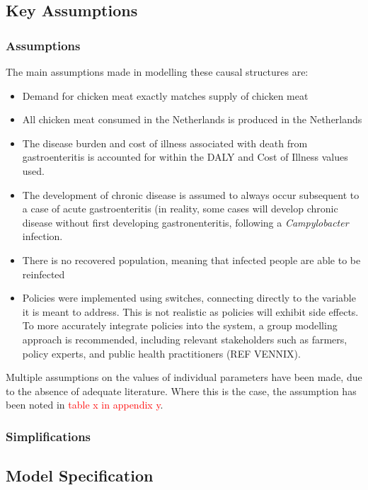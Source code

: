 \subsection{Key Assumptions}
\subsubsection{Assumptions}
The main assumptions made in modelling these causal structures are:
\begin{itemize}
    \item Demand for chicken meat exactly matches supply of chicken meat
    \item All chicken meat consumed in the Netherlands is produced in the Netherlands
    \item The disease burden and cost of illness associated with death from gastroenteritis is accounted for within the DALY and Cost of Illness values used.
    \item The development of chronic disease is assumed to always occur subsequent to a case of acute gastroenteritis (in reality, some cases will develop chronic disease without first developing gastronenteritis, following a \textit{Campylobacter} infection.
    \item There is no recovered population, meaning that infected people are able to be reinfected
    \item Policies were implemented using switches, connecting directly to the variable it is meant to address. This is not realistic as policies will exhibit side effects. To more accurately integrate policies into the system,  a group modelling approach is recommended, including relevant stakeholders such as farmers, policy experts, and public health practitioners (REF VENNIX).
\end{itemize}

Multiple assumptions on the values of individual parameters have been made, due to the absence of adequate literature. Where this is the case, the assumption has been noted in \textcolor{red}{table x in appendix y}.
\subsubsection{Simplifications}

\subsection{Model Specification}

